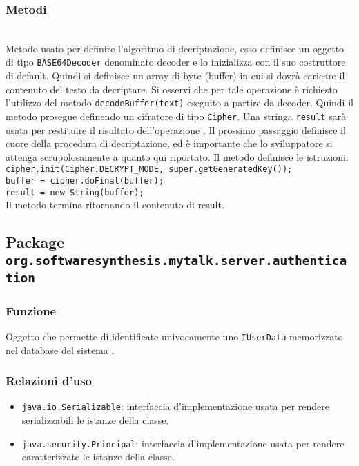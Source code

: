 \subsubsection*{Metodi}
\begin{description}

	\item{}\\
	Metodo usato per definire l'algoritmo di decriptazione, esso definisce un oggetto di tipo \texttt{BASE64Decoder} denominato decoder e lo inizializza con il suo costruttore di default. Quindi si definisce un array di byte (buffer) in cui si dovrà caricare il contenuto del testo da decriptare. Si osservi che per tale operazione è richiesto l'utilizzo del metodo \texttt{decodeBuffer(text)} eseguito a partire da decoder. Quindi il metodo prosegue definendo  un cifratore di tipo \texttt{Cipher}. Una stringa \texttt{result} sarà usata per restituire il risultato dell'operazione . Il prossimo passaggio definisce il cuore della procedura di decriptazione, ed è importante che lo sviluppatore si attenga scrupolosamente a quanto qui riportato. Il metodo definisce le istruzioni:\\
	
	\verb|cipher.init(Cipher.DECRYPT_MODE, super.getGeneratedKey());|\\
	\verb|buffer = cipher.doFinal(buffer);|\\
	\verb|result = new String(buffer);|\\
	
	Il metodo termina ritornando il contenuto di result.
	
\end{description}

\subsection{Package \texttt{org.softwaresynthesis.mytalk.server.authentication}}\label{sec:authentication}


\subsubsection*{Funzione}
Oggetto che permette di identificate univocamente uno \texttt{IUserData} memorizzato nel database del sistema \caName.

\subsubsection*{Relazioni d'uso}
\begin{itemize}
	\item \texttt{java.io.Serializable}: interfaccia d'implementazione usata per rendere serializzabili le istanze della classe.
	\item \texttt{java.security.Principal}: interfaccia d'implementazione usata per rendere caratterizzate le istanze della classe.
\end{itemize}

